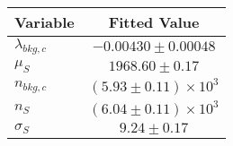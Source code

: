 \begin{tabular}[t]{lc}
\hline
Variable &Fitted Value\\
\hline\hline
$\lambda_{bkg,c}$&$-0.00430\pm0.00048$\\
\hline
$\mu_{S}$&$1968.60\pm0.17$\\
\hline
$n_{bkg,c}$&$(5.93\pm0.11)\times 10^3$\\
\hline
$n_{S}$&$(6.04\pm0.11)\times 10^3$\\
\hline
$\sigma_{S}$&$9.24\pm0.17$\\
\hline
\end{tabular}